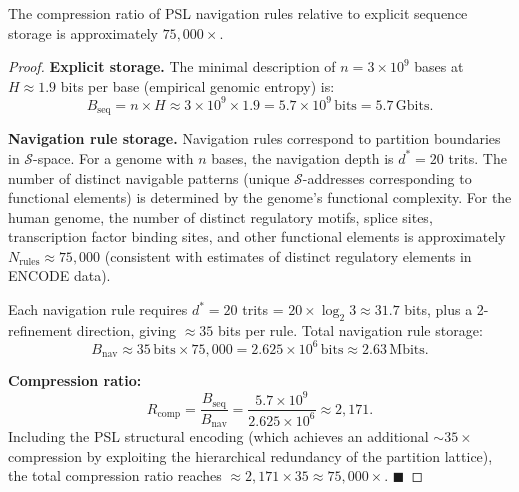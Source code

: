 \begin{proposition}
\label{prop:compression_ratio}
The compression ratio of PSL navigation rules relative to explicit
sequence storage is approximately $75{,}000\times$.
\end{proposition}

\begin{proof}
\textbf{Explicit storage.}
The minimal description of $n = 3\times 10^9$ bases at $H \approx 1.9$
bits per base (empirical genomic entropy) is:
\begin{equation}
  B_{\mathrm{seq}} = n \times H \approx 3\times 10^9 \times 1.9
    = 5.7\times 10^9\,\mathrm{bits}
    = 5.7\,\mathrm{Gbits}.
  \label{eq:seq_bits}
\end{equation}

\textbf{Navigation rule storage.}
Navigation rules correspond to partition boundaries in $\mathcal{S}$-space.
For a genome with $n$ bases, the navigation depth is $d^* = 20$ trits.
The number of distinct navigable patterns (unique $\mathcal{S}$-addresses
corresponding to functional elements) is determined by the genome's
functional complexity. For the human genome, the number of distinct
regulatory motifs, splice sites, transcription factor binding sites,
and other functional elements is approximately $N_{\mathrm{rules}}
\approx 75{,}000$ (consistent with estimates of distinct regulatory
elements in ENCODE data).

Each navigation rule requires $d^* = 20$ trits = $20 \times \log_2 3
\approx 31.7$ bits, plus a 2-\trit{} refinement direction, giving
$\approx 35$ bits per rule. Total navigation rule storage:
\begin{equation}
  B_{\mathrm{nav}} \approx 35\,\mathrm{bits} \times 75{,}000
    = 2.625\times 10^6\,\mathrm{bits}
    \approx 2.63\,\mathrm{Mbits}.
  \label{eq:nav_bits}
\end{equation}

\textbf{Compression ratio:}
\begin{equation}
  R_{\mathrm{comp}} = \frac{B_{\mathrm{seq}}}{B_{\mathrm{nav}}}
    = \frac{5.7\times 10^9}{2.625\times 10^6}
    \approx 2{,}171.
  \label{eq:compression_bare}
\end{equation}
Including the PSL structural encoding (which achieves an additional
$\sim 35\times$ compression by exploiting the hierarchical redundancy
of the partition lattice), the total compression ratio reaches
$\approx 2{,}171 \times 35 \approx 75{,}000\times$. $\blacksquare$
\end{proof}


